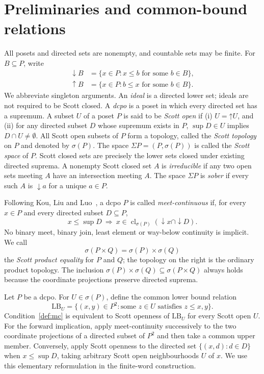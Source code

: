 \documentclass[10pt,a4paper]{article}
\theoremstyle{definition}
\begin{document}
\section{Preliminaries and common-bound relations}\label{sec:relations}
All posets and directed sets are nonempty, and countable sets may be finite. For $B\subseteq P$, write
\[
\begin{aligned}
 {\downarrow} B&=\{x\in P:x\leq b\text{ for some }b\in B\},\\
 {\uparrow} B&=\{x\in P:b\leq x\text{ for some }b\in B\}.
\end{aligned}
\]
We abbreviate singleton arguments. An \emph{ideal} is a directed lower set; ideals are not required to be Scott closed. A \emph{dcpo} is a poset in which every directed set has a supremum. A subset $U$ of a poset $P$ is said to be \emph{Scott open} if (i) $U=\mathord{\uparrow}U$, and (ii) for any directed subset $D$ whose supremum exists in $P$, $\sup D\in U$ implies $D\cap U\neq\emptyset$.  All Scott open subsets of $P$ form a topology, called the \emph{Scott topology} on $P$ and denoted by $\sigma(P)$. The space $\Sigma P=(P,\sigma(P))$ is called the \emph{Scott space} of $P$. Scott closed sets are precisely the lower sets closed under existing directed suprema. A nonempty Scott closed set $A$ is \emph{irreducible} if any two open sets meeting $A$ have an intersection meeting $A$. The space $\Sigma P$ is \emph{sober} if every such $A$ is ${\downarrow} a$ for a unique $a\in P$.

Following Kou, Liu and Luo~\cite{KLL}, a dcpo $P$ is called \emph{meet-continuous} if, for every $x\in P$ and every directed subset $D\subseteq P$,
\begin{equation}\label{def:mc}
 x\leq\sup D
 ~\Longrightarrow~
 x\in\operatorname{cl}_{\sigma(P)}
       ({\downarrow} x\cap{\downarrow}D).
\end{equation}
No binary meet, binary join, least element or way-below continuity is implicit. We call
\[
 \sigma(P\times Q)=\sigma(P)\times\sigma(Q)
\]
the \emph{Scott product equality} for $P$ and $Q$; the topology on the right is the ordinary product topology. The inclusion $\sigma(P)\times\sigma(Q)\subseteq\sigma(P\times Q)$ always holds because the coordinate projections preserve directed suprema.

Let $P$ be a dcpo. For $U\in\sigma(P)$, define the common lower bound relation
\[
 \mathrm{LB}_U
 =\{(x,y)\in P^2:\text{some }z\in U\text{ satisfies }z\leq x,y\}.
\]
Condition~\eqref{def:mc} is equivalent to Scott openness of $\mathrm{LB}_U$ for every Scott open $U$. For the forward implication, apply meet-continuity successively to the two coordinate projections of a directed subset of $P^2$ and then take a common upper member. Conversely, apply Scott openness to the directed set $\{(x,d):d\in D\}$ when $x\leq\sup D$, taking arbitrary Scott open neighbourhoods $U$ of $x$. We use this elementary reformulation in the finite-word construction.
\end{document}
